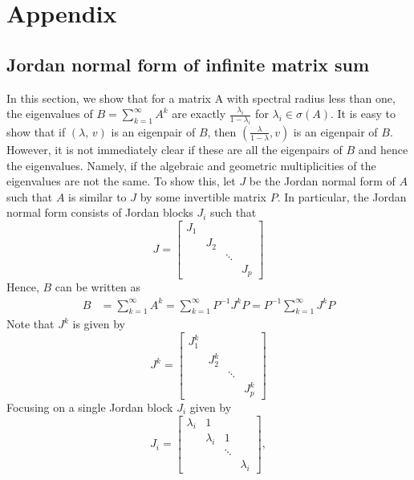\documentclass[../Thesis.tex]{subfiles}
\begin{document}
\chapter{Appendix}

\section{Jordan normal form of infinite matrix sum}\label{app:Jordan normal form of infinite matrix sum}
In this section, we show that for a matrix A with spectral radius less than one, the eigenvalues of $B = \sum_{k=1}^{\infty} A^k$ are exactly $\frac{\lambda_i}{1- \lambda_i}$ for $\lambda_i \in \sigma \left(A\right)$. It is easy to show that if $\left(\lambda, \, v\right)$ is an eigenpair of $B$, then $\left(\frac{\lambda}{1 - \lambda}, v\right)$ is an eigenpair of $B$. However, it is not immediately clear if these are all the eigenpairs of $B$ and hence the eigenvalues. Namely, if the algebraic and geometric multiplicities of the eigenvalues are not the same. To show this, let $J$ be the Jordan normal form of $A$ such that $A$ is similar to $J$ by some invertible matrix $P$. In particular, the Jordan normal form consists of Jordan blocks $J_i$ such that
$$J = \begin{bmatrix}
        J_1 &     &        &     \\
            & J_2 &        &     \\
            &     & \ddots &     \\
            &     &        & J_p
    \end{bmatrix}$$
Hence, $B$ can be written as
\begin{align*}
    B & = \sum_{k=1}^{\infty} A^k  = \sum_{k=1}^{\infty} P^{-1} J^k P  = P^{-1} \sum_{k=1}^{\infty} J^k P
\end{align*}
Note that $J^k$ is given by
$$J^k = \begin{bmatrix}
        J_1^k &       &        &       \\
              & J_2^k &        &       \\
              &       & \ddots &       \\
              &       &        & J_p^k
    \end{bmatrix}$$
Focusing on a single Jordan block $J_i$ given by
$$J_i = \begin{bmatrix}
        \lambda_i & 1         &        &           \\
                  & \lambda_i & 1      &           \\
                  &           & \ddots &           \\
                  &           &        & \lambda_i
    \end{bmatrix},$$
\end{document}
